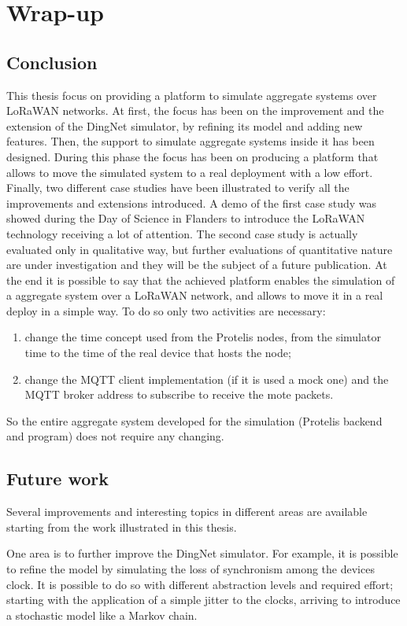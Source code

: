 \chapter{Wrap-up}
\label{chap:conclusions}
\section{Conclusion} 
This thesis focus on providing a platform to simulate aggregate systems over \mbox{LoRaWAN} networks.
At first, the focus has been on the improvement and the extension of the DingNet simulator, by refining its model and adding new features.
Then, the support to simulate aggregate systems inside it has been designed. 
During this phase the focus has been on producing a platform that allows to move the simulated system to a real deployment with a low effort.
Finally, two different case studies have been illustrated to verify all the improvements and extensions introduced.
A demo of the first case study was showed during the Day of Science in Flanders to introduce the LoRaWAN technology receiving a lot of attention.
The second case study is actually evaluated only in qualitative way, but further evaluations of quantitative nature are under investigation and they will be the subject of a future publication.
At the end it is possible to say that the achieved platform enables the simulation of a aggregate system over a LoRaWAN network, and allows to move it in a real deploy in a simple way. 
To do so only two activities are necessary:
\begin{enumerate}
    \item change the time concept used from the Protelis nodes, from the simulator time to the time of the real device that hosts the node;
    \item change the MQTT client implementation (if it is used a mock one) and the MQTT broker address to subscribe to receive the mote packets.
\end{enumerate}
 So the entire aggregate system developed for the simulation (Protelis backend and program) does not require any changing.

\section{Future work}
Several improvements and interesting topics in different areas are available starting from the work illustrated in this thesis.

One area is to further improve the DingNet simulator. 
For example, it is possible to refine the model by simulating the loss of synchronism among the devices clock. 
It is possible to do so with different abstraction levels and required effort; starting with the application of a simple jitter to the clocks, arriving to introduce a stochastic model like a Markov chain.

